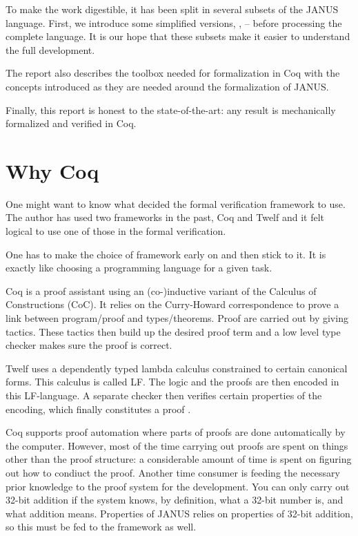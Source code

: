 To make the work digestible, it has been split in several subsets of
the JANUS language. First, we introduce some simplified versions,
\janusz{}, \januso{} -- before processing the complete language. It is
our hope that these subsets make it easier to understand the full
development.

The report also describes the toolbox needed for formalization in
Coq with the concepts introduced as they are needed around the
formalization of JANUS.

Finally, this report is honest to the state-of-the-art: any result is
mechanically formalized and verified in Coq.

\section{Why Coq}

One might want to know what decided the formal verification framework
to use. The author has used two frameworks in the past, Coq and Twelf
and it felt logical to use one of those in the formal verification.

One has to make the choice of framework early on and then stick to
it. It is exactly like choosing a programming language for a given
task.

Coq is a proof assistant using an (co-)inductive variant of the
Calculus of Constructions (CoC). It relies on the Curry-Howard
correspondence to prove a link between program/proof and
types/theorems. Proof are carried out by giving tactics. These tactics
then build up the desired proof term and a low level type checker
makes sure the proof is correct.

Twelf uses a dependently typed lambda calculus constrained to certain
canonical forms. This calculus is called LF. The logic and the proofs
are then encoded in this LF-language. A separate checker then verifies
certain properties of the encoding, which finally constitutes a proof
.

Coq supports proof automation where parts of proofs are done
automatically by the computer. However, most of the time carrying out
proofs are spent on things other than the proof structure: a
considerable amount of time is spent on figuring out how to condiuct
the proof. Another time consumer is feeding the necessary prior
knowledge to the proof system for the development. You can only carry
out 32-bit addition if the system knows, by definition, what a 32-bit
number is, and what addition means. Properties of JANUS relies on
properties of 32-bit addition, so this must be fed to the framework as
well.

